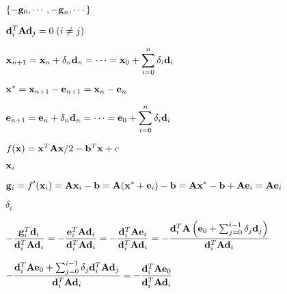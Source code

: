 \documentclass{article}
\def\lthtmlcheckvsize{\ifdim\ht\sizebox<\vsize 
  \ifdim\wd\sizebox<\hsize\expandafter\hfill\fi \expandafter\vfill
  \else\expandafter\vss\fi}%
\begin{document}
{\newpage\clearpage
{}%
$ \{ -{\bf g}_0,\cdots,-{\bf g}_n,\cdots\}$%
\lthtmlindisplaymathZ
\lthtmlcheckvsize\clearpage}

{\newpage\clearpage
{}%
$ {\bf d}_i^T{\bf Ad}_j=0\;(i\ne j)$%
\lthtmlindisplaymathZ
\lthtmlcheckvsize\clearpage}

{\newpage\clearpage
{}%
$\displaystyle {\bf x}_{n+1}={\bf x}_n+\delta_n{\bf d}_n
=\cdots ={\bf x}_0+\sum_{i=0}^n \delta_i{\bf d}_i$%
\lthtmlindisplaymathZ
\lthtmlcheckvsize\clearpage}

{\newpage\clearpage
{}%
$ {\bf x}^*={\bf x}_{n+1}-{\bf e}_{n+1}={\bf x}_n-{\bf e}_n$%
\lthtmlindisplaymathZ
\lthtmlcheckvsize\clearpage}

{\newpage\clearpage
{}%
$\displaystyle {\bf e}_{n+1}={\bf e}_n+\delta_n{\bf d}_n
=\cdots={\bf e}_0+\sum_{i=0}^n \delta_i{\bf d}_i$%
\lthtmlindisplaymathZ
\lthtmlcheckvsize\clearpage}

{\newpage\clearpage
{}%
$ f({\bf x})={\bf x}^T{\bf Ax}/2-{\bf b}^T{\bf x}+c$%
\lthtmlindisplaymathZ
\lthtmlcheckvsize\clearpage}

{\newpage\clearpage
{}%
$ {\bf x}_i$%
\lthtmlindisplaymathZ
\lthtmlcheckvsize\clearpage}

{\newpage\clearpage
{}%
$\displaystyle {\bf g}_i=f'({\bf x}_i)
={\bf A}{\bf x}_i-{\bf b}={\bf A}({\bf x}^*+{\bf e}_i)-{\bf b}
={\bf A}{\bf x}^*-{\bf b}+{\bf A}{\bf e}_i={\bf A}{\bf e}_i$%
\lthtmlindisplaymathZ
\lthtmlcheckvsize\clearpage}

{\newpage\clearpage
{}%
$\displaystyle \delta_i$%
\lthtmlindisplaymathZ
\lthtmlcheckvsize\clearpage}

{\newpage\clearpage
{}%
$\displaystyle -\frac{{\bf g}_i^T{\bf d}_i}{{\bf d}_i^T{\bf A}{\bf d}_i}
=-\frac{{\bf e}_i^T{\bf A}{\bf d}_i}{{\bf d}_i^T{\bf A}{\bf d}_i}
=-\frac{{\bf d}_i^T{\bf A}{\bf e}_i}{{\bf d}_i^T{\bf A}{\bf d}_i}
=-\frac{ {\bf d}^T_i{\bf A} \left( {\bf e}_0+\sum_{j=0}^{i-1}\delta_j{\bf d}_j \right)}{{\bf d}^T_i{\bf A}{\bf d}_i}$%
\lthtmlindisplaymathZ
\lthtmlcheckvsize\clearpage}

{\newpage\clearpage
{}%
$\displaystyle -\frac{ {\bf d}^T_i{\bf A}{\bf e}_0+\sum_{j=0}^{i-1}\delta_j{\bf d}^T_i{\bf A}{\bf d}_j}{{\bf d}^T_i{\bf A}{\bf d}_i}
=-\frac{ {\bf d}^T_i{\bf A}{\bf e}_0}{ {\bf d}^T_i{\bf A}{\bf d}_i}$%
\lthtmlindisplaymathZ
\lthtmlcheckvsize\clearpage}
\end{document}
